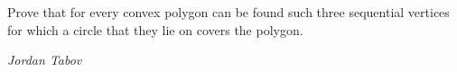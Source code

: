 Prove that for every convex polygon can be found such three sequential vertices for which a circle that they lie on covers the polygon.

\textit{Jordan Tabov}